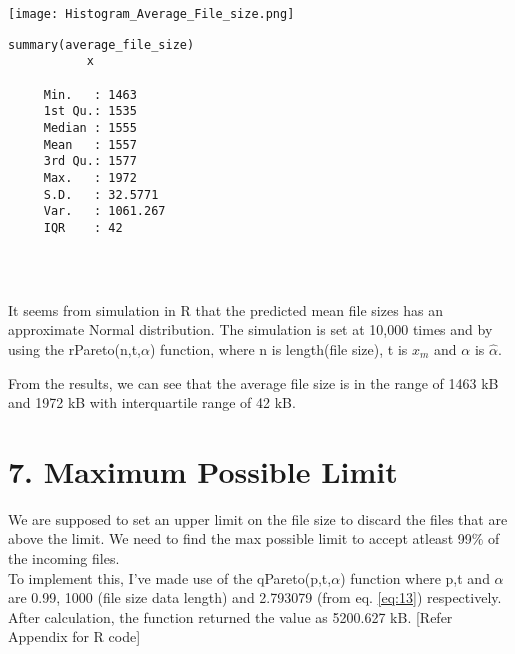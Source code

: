 \documentclass[11pt]{article}
\begin{document}
\begin{minipage}{0.5\textwidth}
    \centering
    \texttt{[image: Histogram\_Average\_File\_size.png]}
    \label{fig:hist_average}
\end{minipage}
\begin{minipage}{0.5\textwidth}
    \centering
    \begin{lstlisting}[caption={Numerical Summary},
                        label={list:summary2},
                        captionpos=b]
     summary(average_file_size)
           x         
           
     Min.   : 1463
     1st Qu.: 1535
     Median : 1555
     Mean   : 1557 
     3rd Qu.: 1577
     Max.   : 1972
     S.D.   : 32.5771
     Var.   : 1061.267
     IQR    : 42
     
    \end{lstlisting}
\end{minipage} \\

\par It seems from simulation in R that the predicted mean file sizes has an approximate Normal distribution. The simulation is set at 10,000 times and by using the rPareto(n,t,$\alpha$) function, where n is length(file size), t is $x_m$ and $\alpha$ is $\hat\alpha$. \\
\par From the results, we can see that the average file size is in the range of 1463 kB and 1972 kB with interquartile range of 42 kB.

\section*{7. Maximum Possible Limit}

We are supposed to set an upper limit on the file size to discard the files that are above the limit. We need to find the max possible limit to accept atleast 99$\%$ of the incoming files. \\

To implement this, I've made use of the qPareto(p,t,$\alpha$) function where p,t and $\alpha$ are 0.99, 1000 (file size data length) and  2.793079 (from eq. \eqref{eq:13}) respectively. \\

After calculation, the function returned the value as 5200.627 kB. [Refer Appendix for R code]\\
\end{document}
